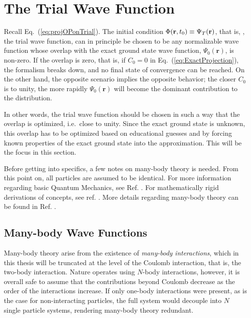 \section{The Trial Wave Function}
\label{sec:trialWF}

Recall Eq.~(\ref{eq:projOPonTrial}). The initial condition $\Phi(\mathbf{r}, t_0) \equiv \Psi_T(\mathbf{r})$, that is,
, the trial wave function, can in principle be chosen to be any normalizable wave function whose overlap with the exact ground state wave function, $\Psi_0(\mathbf{r})$, is non-zero. If the overlap is zero, that is, if $C_0=0$ in Eq.~(\ref{eq:ExactProjection}), the formalism breaks down, and no final state of convergence can be reached. On the other hand, the opposite scenario implies the opposite behavior; the closer $C_0$ is to unity, the more rapidly $\Psi_0(\mathbf{r})$ will become the dominant contribution to the distribution. 

In other words, the trial wave function should be chosen in such a way that the overlap is optimized, i.e.~close to unity. Since the exact ground state is unknown, this overlap has to be optimized based on educational guesses and by forcing known properties of the exact ground state into the approximation. This will be the focus in this section.  

Before getting into specifics, a few notes on many-body theory is needed. From this point on, all particles are assumed to be identical. For more information regarding basic Quantum Mechanics, see Ref. \cite{griffiths}. For mathematically rigid derivations of concepts, see ref. \cite{Sakurai:94}. More details regarding many-body theory can be found in Ref. \cite{Shavitt}. 

\subsection{Many-body Wave Functions}
\label{sec:manyBodyWFs}

Many-body theory arise from the existence of \textit{many-body interactions}, which in this thesis will be truncated at the level of the Coulomb interaction, that is, the two-body interaction. Nature operates using  $N$-body interactions, however, it is overall safe to assume that the contributions beyond Coulomb decrease as the order of the interactions increase. If only one-body interactions were present, as is the case for non-interacting particles, the full system would decouple into $N$ single particle systems, rendering many-body theory redundant.

